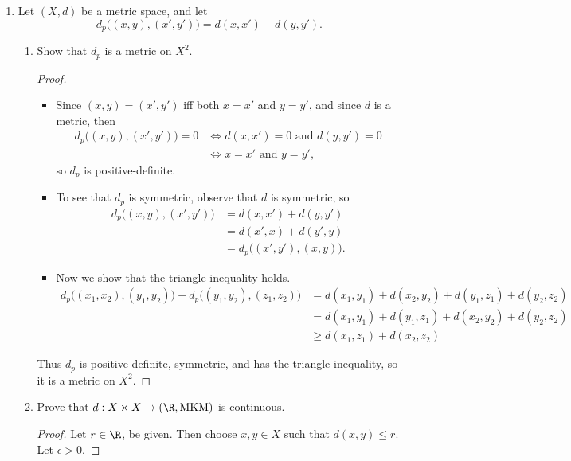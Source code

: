 \documentclass[12pt,letterpaper]{article}
\begin{document}
\begin{enumerate}
\item Let $(X,d)$ be a metric space, and let 
$$d_p\big((x,y),(x',y')\big)=d(x,x')+d(y,y').$$
\begin{enumerate}
\item Show that $d_p$ is a metric on $X^2$. 
\begin{proof}\mbox{}
\begin{itemize}
\item Since $(x,y)=(x',y')$ iff both $x=x'$ and $y=y'$, and since $d$ is a metric, then 
\begin{align*}
d_p\big((x,y),(x',y')\big)=0 &\iff d(x,x')=0 \text{ and } d(y,y')=0 \\
&\iff x=x' \text{ and } y=y',
\end{align*}
so $d_p$ is positive-definite.
\item To see that $d_p$ is symmetric, observe that $d$ is symmetric, so 
\begin{align*}
d_p\big((x,y),(x',y')\big)&=d(x,x')+d(y,y') \\
&=d(x',x)+d(y',y) \\
&=d_p\big((x',y'),(x,y)\big).
\end{align*}
\item Now we show that the triangle inequality holds. 
\begin{align*}
d_p\big((x_1,x_2),(y_1,y_2)\big)+d_p\big((y_1,y_2),(z_1,z_2)\big)&=d(x_1,y_1)+d(x_2,y_2)+d(y_1,z_1)+d(y_2,z_2)\\
&=d(x_1,y_1)+d(y_1,z_1)+d(x_2,y_2)+d(y_2,z_2)\\
&\geq d(x_1,z_1)+d(x_2,z_2)
\end{align*}
\end{itemize}
Thus $d_p$ is positive-definite, symmetric, and has the triangle inequality, so it is a metric on $X^2$. \qedhere
\end{proof}
\item Prove that $d:X\times X \to (\R, \text{MKM})$ is continuous. 
\begin{proof}
Let $r\in\R$, be given. Then choose $x,y \in X$ such that $d(x,y)\leq r$. Let $\epsilon>0$.


\end{proof}
\end{enumerate}
\end{enumerate}
\end{document}
